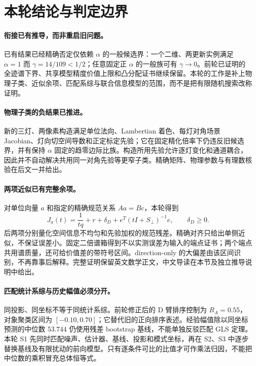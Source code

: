 \section{本轮结论与判定边界}
\label{sec:extension-summary}

\paragraph{衔接已有推导，而非重启旧问题。}
已有结果已经精确否定仅依赖 $\alpha$ 的一般候选界：一个二维、两更新实例满足 $\alpha=1$ 而 $\gamma=14/109<1/2$；任意固定正 $\alpha$ 的一般族可有 $\gamma\to0$。前轮已证明的全迹谱下界、共享模型精度价值上限和凸分配证书继续保留。本轮的工作是补上物理子类、近似余项、匹配系综与联合信息模型的范围，而不是把有限随机搜索改称证明。

\paragraph{物理子类的负结果已推进。}
新的三灯、两像素构造满足单位法向、Lambertian 着色、每灯对角场景 Jacobian、灯向切空间导数和正定标定先验；它在固定精化倍率下仍违反旧候选界，并有保持 $\alpha$ 固定的趋零边际比族。构造所用先验允许逐灯变化和通道耦合，因此并不自动解决共用同一对角先验等更窄子类。精确矩阵、物理参数与有理数核验在后文一并给出。

\paragraph{两项近似已有完整余项。}
对单位向量 $a$ 和指定的精确规范关系 $Aa=Bc$，本轮得到
\begin{equation}
 J_a(t)=\frac1{tq}+r+\delta_D+
            e^T(tI+S_\perp)^{-1}e,
 \qquad \delta_D\ge0.
\end{equation}
后两项分别量化空间信息不均匀和先验加权的规范残差。精确对齐只给出单侧近似，不保证误差小。固定二倍谱箱得到不以实测误差为输入的端点证书；两个端点共用谱质量，还可给价值差的带符号区间。direction-only 的大偏差由该区间识别，不再靠事后解释。完整证明保留英文数学正文，中文导读在本节及独立推导说明中给出。

\paragraph{匹配统计系综与历史幅值必须分开。}
同投影、同坐标不等于同统计系综。前轮修正后的 D 臂排序控制为 $R_A=0.55$，对象聚类区间为 $[-0.10,0.70]$；它替代旧的正向排序表述。经验幅值除以同坐标预测的中位数 $53.744$ 仍使用残差 bootstrap 基线，不能单独反驳匹配 GLS 定理。本轮 S1 先同时匹配噪声、估计器、基线、投影和模式坐标，再在 S2、S3 中逐步替换基线及有限扰动的前向模型。只有逐条件可比的比值才可作乘法归因，不能把中位数的乘积冒充总体恒等式。

